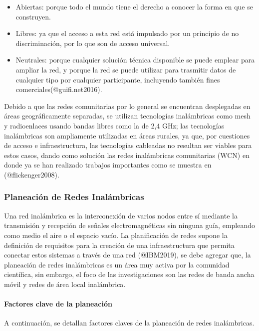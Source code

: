 \documentclass[]{article}
\let\oldparagraph\paragraph
\renewcommand{\paragraph}[1]{\oldparagraph{#1}\mbox{}}
\begin{document}
\begin{itemize}
\item
  Abiertas: porque todo el mundo tiene el derecho a conocer la forma en
  que se construyen.
\item
  Libres: ya que el acceso a esta red está impulsado por un principio de
  no discriminación, por lo que son de acceso universal.
\item
  Neutrales: porque cualquier solución técnica disponible se puede
  emplear para ampliar la red, y porque la red se puede utilizar para
  trasmitir datos de cualquier tipo por cualquier participante,
  incluyendo también fines comerciales(@guifi.net2016).
\end{itemize}

Debido a que las redes comunitarias por lo general se encuentran
desplegadas en áreas geográficamente separadas, se utilizan tecnologías
inalámbricas como mesh y radioenlaces usando bandas libres como la de
2,4 GHz; las tecnologías inalámbricas son ampliamente utilizadas en
áreas rurales, ya que, por cuestiones de acceso e infraestructura, las
tecnologías cableadas no resultan ser viables para estos casos, dando
como solución las redes inalámbricas comunitarias (WCN) en donde ya se
han realizado trabajos importantes como se muestra en (@flickenger2008).

\subsubsection{Planeación de Redes
Inalámbricas}\label{planeaciuxf3n-de-redes-inaluxe1mbricas}

Una red inalámbrica es la interconexión de varios nodos entre sí
mediante la transmisión y recepción de señales electromagnéticas sin
ninguna guía, empleando como medio el aire o el espacio vacío. La
planificación de redes supone la definición de requisitos para la
creación de una infraestructura que permita conectar estos sistemas a
través de una red (@IBM2019), se debe agregar que, la planeación de
redes inalámbricas es un área muy activa por la comunidad científica,
sin embargo, el foco de las investigaciones son las redes de banda ancha
móvil y redes de área local inalámbrica.

\paragraph{Factores clave de la
planeación}\label{factores-clave-de-la-planeaciuxf3n}

A continuación, se detallan factores claves de la planeación de redes
inalámbricas.
\end{document}
